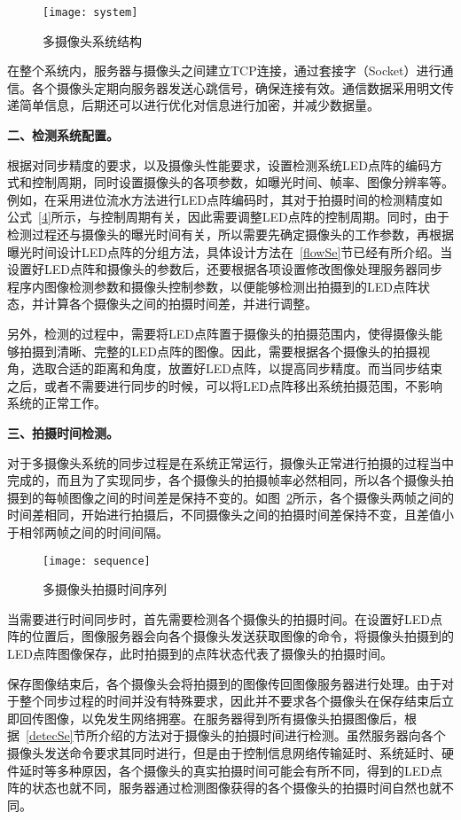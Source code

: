 \begin{figure}[h] 
  \centering
  \texttt{[image: system]}
  \caption{多摄像头系统结构}
    \label{system}
\end{figure}

在整个系统内，服务器与摄像头之间建立TCP连接，通过套接字（Socket）进行通信。各个摄像头定期向服务器发送心跳信号，确保连接有效。通信数据采用明文传递简单信息，后期还可以进行优化对信息进行加密，并减少数据量。

\textbf{二、检测系统配置。}

根据对同步精度的要求，以及摄像头性能要求，设置检测系统LED点阵的编码方式和控制周期，同时设置摄像头的各项参数，如曝光时间、帧率、图像分辨率等。例如，在采用进位流水方法进行LED点阵编码时，其对于拍摄时间的检测精度如公式~\ref{4}所示，与控制周期有关，因此需要调整LED点阵的控制周期。同时，由于检测过程还与摄像头的曝光时间有关，所以需要先确定摄像头的工作参数，再根据曝光时间设计LED点阵的分组方法，具体设计方法在~\ref{flowSe}节已经有所介绍。当设置好LED点阵和摄像头的参数后，还要根据各项设置修改图像处理服务器同步程序内图像检测参数和摄像头控制参数，以便能够检测出拍摄到的LED点阵状态，并计算各个摄像头之间的拍摄时间差，并进行调整。

另外，检测的过程中，需要将LED点阵置于摄像头的拍摄范围内，使得摄像头能够拍摄到清晰、完整的LED点阵的图像。因此，需要根据各个摄像头的拍摄视角，选取合适的距离和角度，放置好LED点阵，以提高同步精度。而当同步结束之后，或者不需要进行同步的时候，可以将LED点阵移出系统拍摄范围，不影响系统的正常工作。

\textbf{三、拍摄时间检测。}

对于多摄像头系统的同步过程是在系统正常运行，摄像头正常进行拍摄的过程当中完成的，而且为了实现同步，各个摄像头的拍摄帧率必然相同，所以各个摄像头拍摄到的每帧图像之间的时间差是保持不变的。如图~\ref{sequence}所示，各个摄像头两帧之间的时间差相同，开始进行拍摄后，不同摄像头之间的拍摄时间差保持不变，且差值小于相邻两帧之间的时间间隔。

\begin{figure}[h] 
  \centering
  \texttt{[image: sequence]}
  \caption{多摄像头拍摄时间序列}
    \label{sequence}
\end{figure}

当需要进行时间同步时，首先需要检测各个摄像头的拍摄时间。在设置好LED点阵的位置后，图像服务器会向各个摄像头发送获取图像的命令，将摄像头拍摄到的LED点阵图像保存，此时拍摄到的点阵状态代表了摄像头的拍摄时间。

保存图像结束后，各个摄像头会将拍摄到的图像传回图像服务器进行处理。由于对于整个同步过程的时间并没有特殊要求，因此并不要求各个摄像头在保存结束后立即回传图像，以免发生网络拥塞。在服务器得到所有摄像头拍摄图像后，根据~\ref{detecSe}节所介绍的方法对于摄像头的拍摄时间进行检测。虽然服务器向各个摄像头发送命令要求其同时进行，但是由于控制信息网络传输延时、系统延时、硬件延时等多种原因，各个摄像头的真实拍摄时间可能会有所不同，得到的LED点阵的状态也就不同，服务器通过检测图像获得的各个摄像头的拍摄时间自然也就不同。

